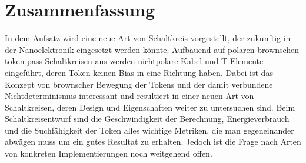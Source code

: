 \documentclass[11pt,a4paper]{article}
\begin{document}
\section{Zusammenfassung}
In dem Aufsatz \cite{Peper_nonPolar_2018} wird eine neue Art
von Schaltkreis vorgestellt, der zukünftig in der Nanoelektronik eingesetzt
werden könnte.
%
Aufbauend auf polaren brownschen token-pass Schaltkreisen aus 
\cite{Peper_Fundamentals_2013} werden nichtpolare Kabel und T-Elemente 
eingeführt, deren Token keinen Bias in eine Richtung haben. 
%
Dabei ist das Konzept von brownscher Bewegung der Tokens und der damit
verbundene Nichtdeterminismus interessant und resultiert in einer neuen Art von
Schaltkreisen, deren Design und Eigenschaften weiter zu untersuchen sind.
%
Beim Schaltkreisentwurf sind die Geschwindigkeit der Berechnung, 
Energieverbrauch und die Suchfähigkeit der Token alles wichtige Metriken,
die man gegeneinander abwägen muss um ein gutes Resultat zu erhalten.
%
Jedoch ist die Frage nach Arten von konkreten Implementierungen 
noch weitgehend offen.





\end{document}
